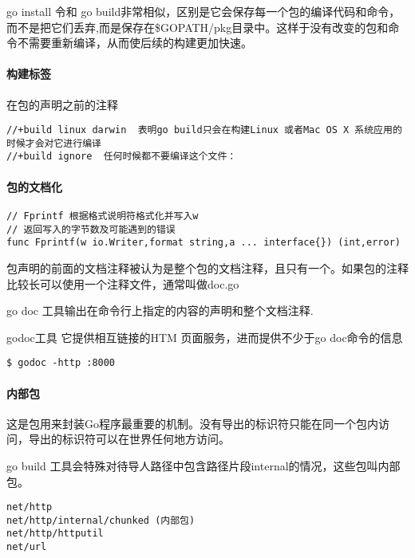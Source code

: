 go install 令和 go
build非常相似，区别是它会保存每一个包的编译代码和命令，而不是把它们丢弃,而是保存在\$GOPATH/pkg目录中。这样于没有改变的包和命令不需要重新编译，从而使后续的构建更加快速。

\hypertarget{ux6784ux5efaux6807ux7b7e}{%
\paragraph{构建标签}\label{ux6784ux5efaux6807ux7b7e}}

在包的声明之前的注释

\begin{verbatim}
//+build linux darwin  表明go build只会在构建Linux 或者Mac OS X 系统应用的时候才会对它进行编译
//+build ignore  任何时候都不要编译这个文件：
\end{verbatim}

\hypertarget{ux5305ux7684ux6587ux6863ux5316}{%
\paragraph{包的文档化}\label{ux5305ux7684ux6587ux6863ux5316}}

\begin{verbatim}
// Fprintf 根据格式说明符格式化并写入w
// 返回写入的字节数及可能遇到的错误
func Fprintf(w io.Writer,format string,a ... interface{}) (int,error)
\end{verbatim}

包声明的前面的文档注释被认为是整个包的文档注释，且只有一个。如果包的注释比较长可以使用一个注释文件，通常叫做doc.go

go doc 工具输出在命令行上指定的内容的声明和整个文档注释.

godoc工具 它提供相互链接的HTM 页面服务，进而提供不少于go doc命令的信息

\begin{verbatim}
$ godoc -http :8000
\end{verbatim}

\hypertarget{ux5185ux90e8ux5305}{%
\paragraph{内部包}\label{ux5185ux90e8ux5305}}

这是包用来封装Go程序最重要的机制。没有导出的标识符只能在同一个包内访问，导出的标识符可以在世界任何地方访问。

go build
工具会特殊对待导人路径中包含路径片段internal的情况，这些包叫内部包。

\begin{verbatim}
net/http 
net/http/internal/chunked (内部包)
net/http/httputil 
net/url
\end{verbatim}

